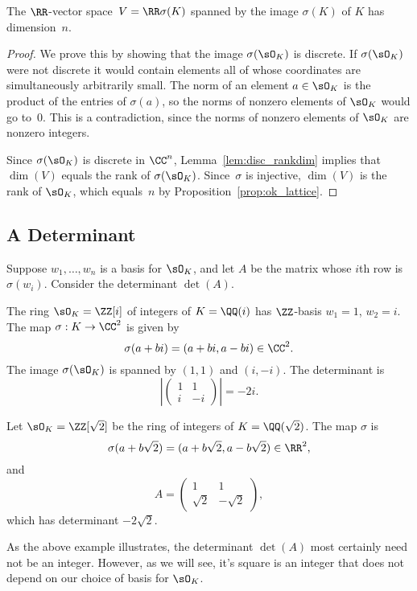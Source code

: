 \begin{proposition}
  The $\RR$-vector space~$V=\RR\sigma(K)$ spanned by the image
  $\sigma(K)$ of $K$ has dimension~$n$.
\end{proposition}
\begin{proof}
  We prove this by showing that the image $\sigma(\sO_K)$ is discrete. If
  $\sigma(\sO_K)$ were not discrete it would contain elements all of
  whose coordinates are simultaneously arbitrarily small.  The norm of
  an element $a\in \sO_K$ is the product of the entries of $\sigma(a)$,
  so the norms of nonzero elements of $\sO_K$ would go to~$0$.  This is a
  contradiction, since the norms of nonzero elements of $\sO_K$ are
  nonzero integers.

  Since $\sigma(\sO_K)$ is discrete in $\CC^n$, Lemma~\ref{lem:disc_rankdim}
  implies that $\dim(V)$ equals the rank of $\sigma(\sO_K)$.  Since~$\sigma$
  is injective, $\dim(V)$ is the rank of $\sO_K$, which equals~$n$ by
  Proposition~\ref{prop:ok_lattice}.
\end{proof}

\subsection{A Determinant}
Suppose $w_1, \dots, w_n$ is a basis for
$\sO_K$, and let $A$ be the matrix whose $i$th row is $\sigma(w_i)$.
Consider the determinant $\det(A)$.
\begin{example}
  The ring $\sO_K=\ZZ[i]$ of integers of $K=\QQ(i)$
  has $\ZZ$-basis $w_1=1$, $w_2=i$.
  The map $\sigma:K\to \CC^2$ is given by
  \[
    \sigma(a+bi) = (a+bi,a-bi)\in\CC^2.
  \]
  The image $\sigma(\sO_K)$ is spanned by
  $(1,1)$ and $(i,-i)$.
  The determinant is
  \[
    \left|\begin{pmatrix} 1 & 1 \\ i & -i \end{pmatrix}\right| = -2i.
  \]

  Let $\sO_K=\ZZ[\sqrt{2}]$ be the ring of integers of $K=\QQ(\sqrt{2})$.
  The map $\sigma$ is
  \[
    \sigma(a+b\sqrt{2}) = (a+b\sqrt{2},a-b\sqrt{2})\in\RR^2,
  \]
  and
  \[
    A = \begin{pmatrix} 1 & 1 \\ \sqrt{2} & -\sqrt{2} \end{pmatrix},
  \]
  which has determinant
  $ -2\sqrt{2}$.
\end{example}
As the above example illustrates, the determinant $\det(A)$ most
certainly need not be an integer.  However, as we will see, it's
square is an integer that does not depend on our choice of
basis for $\sO_K$.


